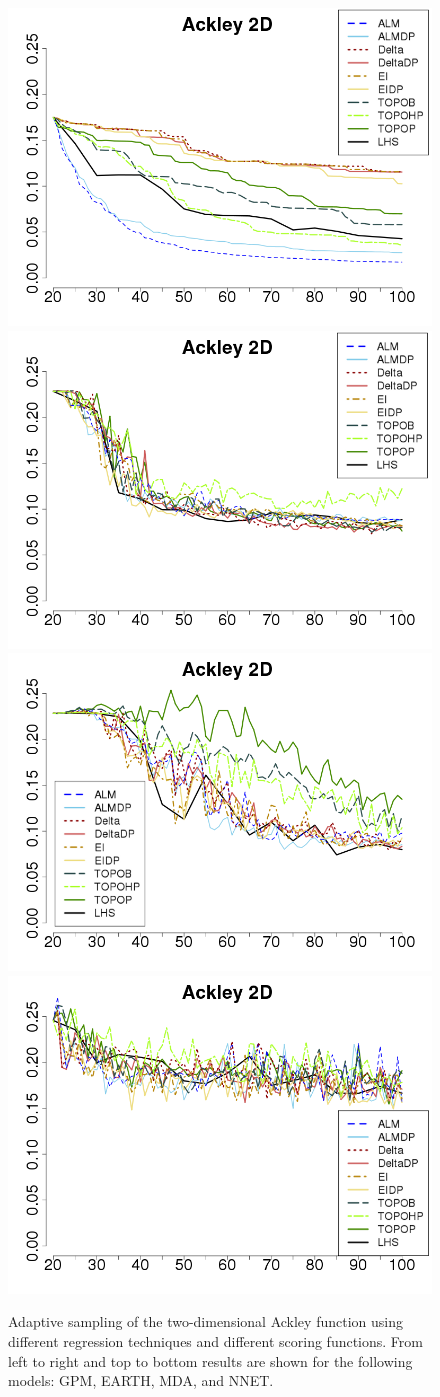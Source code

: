 \begin{figure}[!ht]
\begin{center}
\includegraphics[width=0.45\linewidth]{figs/chap5/gpm_Ackley_td=20}
\includegraphics[width=0.45\linewidth]{figs/chap5/earth_Ackley_td=20}
\includegraphics[width=0.45\linewidth]{figs/chap5/mda_Ackley_td=20}
\includegraphics[width=0.45\linewidth]{figs/chap5/nnet_Ackley_td=20}
\caption[Comparison of RMSE using four prediction models]{Adaptive sampling of the two-dimensional Ackley function using different regression techniques and different scoring functions. From left to right and top to bottom results are shown for the following models: GPM, EARTH, MDA, and NNET.}
\label{fig:ackley2D_results}
\end{center}
\end{figure}

